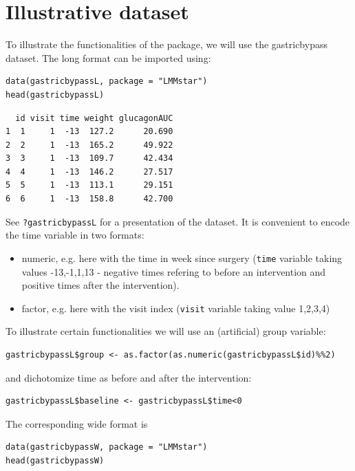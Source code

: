\documentclass[12pt]{article}
\begin{document}
\clearpage

\section{Illustrative dataset}
\label{sec:orgb73e316}

To illustrate the functionalities of the package, we will use the
gastricbypass dataset. The long format can be imported using:
\lstset{language=r,label= ,caption= ,captionpos=b,numbers=none}
\begin{lstlisting}
data(gastricbypassL, package = "LMMstar")
head(gastricbypassL)
\end{lstlisting}

\begin{verbatim}
  id visit time weight glucagonAUC
1  1     1  -13  127.2      20.690
2  2     1  -13  165.2      49.922
3  3     1  -13  109.7      42.434
4  4     1  -13  146.2      27.517
5  5     1  -13  113.1      29.151
6  6     1  -13  158.8      42.700
\end{verbatim}


See \texttt{?gastricbypassL} for a presentation of the dataset. It is
convenient to encode the time variable in two formats:
\begin{itemize}
\item numeric, e.g. here with the time in week since surgery (\texttt{time}
variable taking values -13,-1,1,13 - negative times refering to
before an intervention and positive times after the intervention).
\item factor, e.g. here with the visit index (\texttt{visit} variable taking
value 1,2,3,4)
\end{itemize}

To illustrate certain functionalities we will use an (artificial)
group variable:
\lstset{language=r,label= ,caption= ,captionpos=b,numbers=none}
\begin{lstlisting}
gastricbypassL$group <- as.factor(as.numeric(gastricbypassL$id)%%2)
\end{lstlisting}

and dichotomize time as before and after the intervention:
\lstset{language=r,label= ,caption= ,captionpos=b,numbers=none}
\begin{lstlisting}
gastricbypassL$baseline <- gastricbypassL$time<0
\end{lstlisting}

The corresponding wide format is
\lstset{language=r,label= ,caption= ,captionpos=b,numbers=none}
\begin{lstlisting}
data(gastricbypassW, package = "LMMstar")
head(gastricbypassW)
\end{lstlisting}
\end{document}
